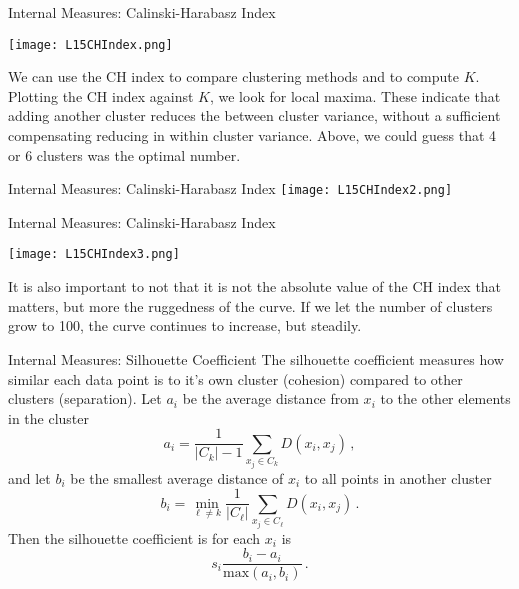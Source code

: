 \documentclass[10pt, table, dvipsnames,xcdraw,handout]{beamer}
\begin{document}
\begin{frame}[fragile]{Internal Measures: Calinski-Harabasz Index}
 \begin{minipage}[t][0.5\textheight][t]{\textwidth}
	\centering \texttt{[image: L15CHIndex.png]} 
  \end{minipage}
  \vfill
\begin{minipage}[t][0.5\textheight][t]{\textwidth}
We can use the CH index to compare clustering methods and to compute $K$. Plotting the CH index against $K$, we look for local maxima. These indicate that adding another cluster reduces the between cluster variance, without a sufficient compensating reducing in within cluster variance. Above, we could guess that 4 or 6 clusters was the optimal number. 
\end{minipage}
\end{frame}



\begin{frame}[fragile]{Internal Measures: Calinski-Harabasz Index}
	\centering \texttt{[image: L15CHIndex2.png]} 
\end{frame}






\begin{frame}[fragile]{Internal Measures: Calinski-Harabasz Index}
 \begin{minipage}[t][0.5\textheight][t]{\textwidth}
	\centering \texttt{[image: L15CHIndex3.png]} 
  \end{minipage}
  \vfill
\begin{minipage}[t][0.5\textheight][t]{\textwidth}
It is also important to not that it is not the absolute value of the CH index that matters, but more the ruggedness of the curve. If we let the number of clusters grow to 100, the curve continues to increase, but steadily. 
\end{minipage}
\end{frame}






\begin{frame}[fragile]{Internal Measures: Silhouette Coefficient}
The silhouette coefficient measures how similar each data point is to it's own cluster (cohesion) compared to other clusters (separation). \pause Let $a_i$ be the average distance from $x_i$ to the other elements in the cluster
$$
a_i = \frac{1}{|C_k| - 1}\sum_{x_j\in C_k} D(x_i,x_j)\,,
$$\pause
and let $b_i$ be the smallest average distance of $x_i$ to all points in another cluster
$$
b_i = \min_{\ell\neq k} \frac{1}{|C_\ell|}\sum_{x_j\in C_\ell} D(x_i,x_j)\,.
$$\pause
Then the silhouette coefficient is for each $x_i$ is 
$$
s_i \frac{b_i - a_i}{\text{max}(a_i,b_i)}\,.
$$
\end{frame}
\end{document}
